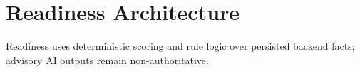 \section{Readiness Architecture}
Readiness uses deterministic scoring and rule logic over persisted backend facts; advisory AI outputs remain non-authoritative.

